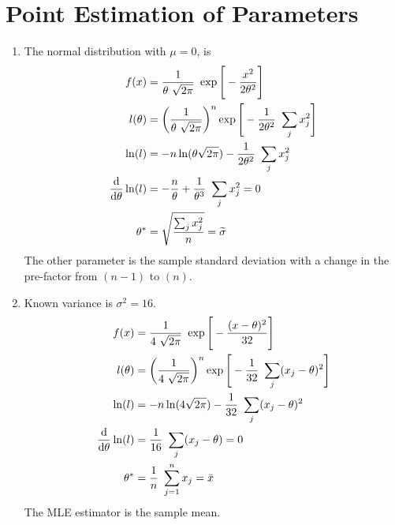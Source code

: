 \section{Point Estimation of Parameters}

\begin{enumerate}
    \item The normal distribution with $ \mu = 0 $, is
          \begin{align}
              f(x)      & = \frac{1}{\theta\ \sqrt{2\pi}}\ \exp\Bigg[ -\frac{x^2}
              {2\theta^2} \Bigg]                                                     \\
              l(\theta) & = \left( \frac{1}{\theta\ \sqrt{2\pi}} \right)^n
              \exp \Bigg[-\frac{1}{2\theta^2}\ \sum_j x_j^2\Bigg]                    \\
              \ln(l)    & = -n\ln(\theta \sqrt{2\pi}) - \frac{1}{2\theta^2}
              \ \sum_j x_j^2                                                         \\
              \diff*{\ln(l)}{\theta}
                        & = -\frac{n}{\theta} + \frac{1}{\theta^3}\ \sum_j x_j^2 = 0 \\
              \theta^*  & = \sqrt{\frac{\sum_j x_j^2}{n}} = \wt{\sigma}
          \end{align}
          The other parameter is the sample standard deviation with a change in the
          pre-factor from $ (n-1) $ to $ (n) $.

    \item Known variance is $ \sigma^2 = 16 $.
          \begin{align}
              f(x)      & = \frac{1}{4\ \sqrt{2\pi}}\ \exp\Bigg[ -
              \frac{(x - \theta)^2}{32} \Bigg]                        \\
              l(\theta) & = \left( \frac{1}{4\ \sqrt{2\pi}} \right)^n
              \exp \Bigg[-\frac{1}{32}\ \sum_j (x_j - \theta)^2\Bigg] \\
              \ln(l)    & = -n\ln(4\sqrt{2\pi}) - \frac{1}{32}
              \ \sum_j (x_j - \theta)^2                               \\
              \diff*{\ln(l)}{\theta}
                        & = \frac{1}{16}\ \sum_j (x_j - \theta) = 0   \\
              \theta^*  & = \frac{1}{n}\ \sum_{j=1}^{n} x_j = \bar{x}
          \end{align}
          The MLE estimator is the sample mean.


\end{enumerate}
